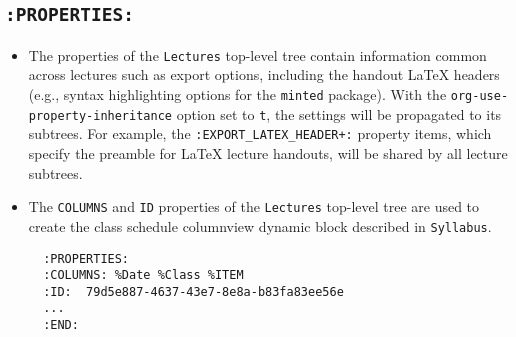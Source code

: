 \documentclass[10pt,article]{article}
\begin{document}
\subsection{\texttt{:PROPERTIES:}}
\label{sec:orgb2921a9}
\begin{itemize}
\item The properties of the \texttt{Lectures} top-level tree contain information common
across lectures such as export options, including the handout \LaTeX{}
headers (e.g., syntax highlighting options for the \texttt{minted} package). With
the \texttt{org-use-property-inheritance} option set to \texttt{t}, the settings will be
propagated to its subtrees. For example, the \texttt{:EXPORT\_LATEX\_HEADER+:}
property items, which specify the preamble for \LaTeX{} lecture handouts, will
be shared by all lecture subtrees.

\item The \texttt{COLUMNS} and \texttt{ID} properties of the \texttt{Lectures} top-level tree
are used to create the class schedule columnview dynamic block
described in \texttt{Syllabus}.

{\footnotesize
\begin{verbatim}
  :PROPERTIES:
  :COLUMNS: %Date %Class %ITEM
  :ID:  79d5e887-4637-43e7-8e8a-b83fa83ee56e
  ...
  :END:
\end{verbatim}
}
\end{itemize}
\end{document}
